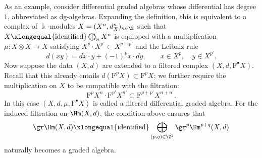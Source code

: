 As an example, consider differential graded algebras whose differential has
degree $1$, abbreviated as dg-algebras. Expanding the definition, this is
equivalent to a complex of $\Bbbk$-modules
$X=(X^n,d_X^n)_{n\in\Z}$ such that
$X\xlongequal{\text{identified}}\bigoplus_nX^n$ is equipped with a
multiplication $\mu:X\otimes X\to X$ satisfying
$X^p\cdot X^{p'}\subset X^{p+p'}$ and the Leibniz rule
\[ d(xy)=dx\cdot y+(-1)^px\cdot dy,
	\qquad x\in X^p,\quad y\in X^{p'}. \]
Now suppose the data $(X,d)$ are extended to a filtered complex
$(X,d,\mathrm{F}^\bullet X)$. Recall that this already entails
$d(\mathrm{F}^pX)\subset\mathrm{F}^pX$; we further require the multiplication
on $X$ to be compatible with the filtration:
\[ \mathrm{F}^pX^n\cdot\mathrm{F}^{p'}X^{n'}
	\subset\mathrm{F}^{p+p'}X^{n+n'}. \]
In this case $(X,d,\mu,\mathrm{F}^\bullet X)$ is called a filtered
differential graded algebra. For the induced filtration on $\Hm(X,d)$, the
condition above ensures that
\[ \gr\Hm(X,d)\xlongequal{\text{identified}}
	\bigoplus_{(p,q)\in\Z^2}\gr^p\Hm^{p+q}(X,d) \]
naturally becomes a graded algebra.

